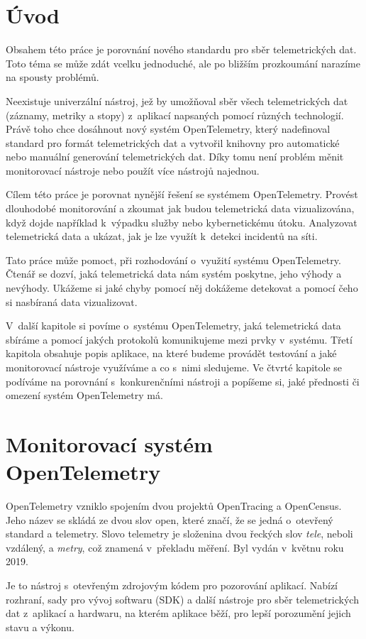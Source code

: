 \chapter{Úvod}
Obsahem této práce je porovnání nového standardu pro sběr telemetrických dat. Toto téma se může zdát vcelku jednoduché, ale po bližším prozkoumání narazíme na spousty problémů. 

Neexistuje univerzální nástroj, jež by umožňoval sběr všech telemetrických dat (záznamy, metriky a stopy) z~aplikací napsaných pomocí různých technologií. Právě toho chce dosáhnout nový systém OpenTelemetry, který nadefinoval standard pro formát telemetrických dat a vytvořil knihovny pro automatické nebo manuální generování telemetrických dat. Díky tomu není problém měnit monitorovací nástroje nebo použít více nástrojů najednou.

Cílem této práce je porovnat nynější řešení se systémem OpenTelemetry. Provést dlouhodobé monitorování a zkoumat jak budou telemetrická data vizualizována, když dojde například k~výpadku služby nebo kybernetickému útoku. Analyzovat telemetrická data a ukázat, jak je lze využít k~detekci incidentů na síti.

Tato práce může pomoct, při rozhodování o~využití systému OpenTelemetry. Čtenář se dozví, jaká telemetrická data nám systém poskytne, jeho výhody a nevýhody. Ukážeme si jaké chyby pomocí něj dokážeme detekovat a pomocí čeho si nasbíraná data vizualizovat.

V~další kapitole si povíme o~systému OpenTelemetry, jaká telemetrická data sbíráme a pomocí jakých protokolů komunikujeme mezi prvky v~systému. Třetí kapitola obsahuje popis aplikace, na které budeme provádět testování a jaké monitorovací nástroje využíváme a co s~nimi sledujeme. Ve čtvrté kapitole se podíváme na porovnání s~konkurenčními nástroji a popíšeme si, jaké přednosti či omezení systém OpenTelemetry má.


\chapter{Monitorovací systém OpenTelemetry}
\label{OpenTelemetrie}
OpenTelemetry vzniklo spojením dvou projektů OpenTracing a OpenCensus. Jeho název se skládá ze dvou slov open, které značí, že se jedná o~otevřený standard a telemetry. Slovo telemetry je  složenina dvou řeckých slov \textit{tele}, neboli vzdálený, a \textit{metry}, což znamená v~překladu měření. Byl vydán v~květnu roku 2019.

Je to nástroj s~otevřeným zdrojovým kódem pro pozorování aplikací. Nabízí rozhraní, sady pro vývoj softwaru (SDK) a další nástroje pro sběr telemetrických dat z~aplikací a hardwaru, na kterém aplikace běží, pro lepší porozumění jejich stavu a výkonu.

